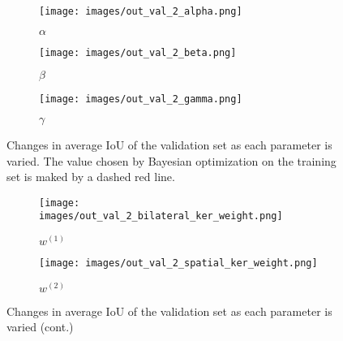 \documentclass[10pt,twocolumn,letterpaper]{article}
\begin{document}
\begin{figure}[t!]
    \begin{subfigure}[t]{0.5\textwidth}
        \centering
        \texttt{[image: images/out\_val\_2\_alpha.png]}
        \caption{$\alpha$}
    \end{subfigure}
    \begin{subfigure}[t]{0.5\textwidth}
        \centering
        \texttt{[image: images/out\_val\_2\_beta.png]}
        \caption{$\beta$}
    \end{subfigure}
    \begin{subfigure}[t]{0.5\textwidth}
        \centering
        \texttt{[image: images/out\_val\_2\_gamma.png]}
        \caption{$\gamma$}
    \end{subfigure} 
    \caption{\small{Changes in average IoU of the validation set as each parameter is varied. The value chosen by Bayesian optimization on the training set is maked by a dashed red line.}}
\end{figure}
\begin{figure}[t!] \ContinuedFloat
    \begin{subfigure}[t]{0.5\textwidth}
        \centering
        \texttt{[image: images/out\_val\_2\_bilateral\_ker\_weight.png]}
        \caption{$w^{(1)}$}
    \end{subfigure}
    \begin{subfigure}[t]{0.5\textwidth}
        \centering
        \texttt{[image: images/out\_val\_2\_spatial\_ker\_weight.png]}
        \caption{$w^{(2)}$}
    \end{subfigure}
    \caption{\small{Changes in average IoU of the validation set as each parameter is varied (cont.)}}
    \label{fig:changes}
\end{figure}
\end{document}
